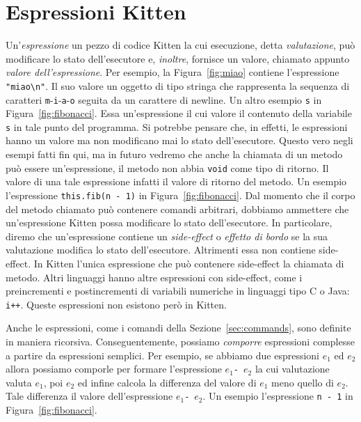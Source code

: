 \section{Espressioni Kitten}\label{sec:expressions}
%
Un'\emph{espressione} \e un pezzo di codice Kitten la cui esecuzione,
detta \emph{valutazione},
pu\`o modificare lo stato dell'esecutore e, \emph{inoltre}, fornisce un
valore, chiamato appunto \emph{valore dell'espressione}. Per esempio, la
Figura~\ref{fig:miao} contiene l'espressione \verb|"miao\n"|. Il suo
valore \e un oggetto di tipo stringa che rappresenta la sequenza di
caratteri \texttt{m}-\texttt{i}-\texttt{a}-\texttt{o} seguita da un
carattere di newline. Un altro esempio \e \texttt{s} in
Figura~\ref{fig:fibonacci}.
Essa \e un'espressione il cui valore \e il contenuto della variabile
\texttt{s} in tale punto del programma.
Si potrebbe pensare che, in effetti, le espressioni
hanno un valore ma non modificano mai lo stato dell'esecutore.
Questo \e vero negli esempi fatti fin qui, ma in futuro vedremo
che anche la chiamata di un metodo pu\`o essere un'espressione, \purche
il metodo non abbia \texttt{void} come tipo di ritorno.
Il valore di una tale espressione \e infatti
il valore di ritorno del metodo. Un esempio \e l'espressione
\texttt{this.fib(n - 1)} in Figura~\ref{fig:fibonacci}. Dal momento che
il corpo del metodo chiamato pu\`o contenere comandi arbitrari,
dobbiamo ammettere che un'espressione Kitten possa modificare lo stato
dell'esecutore. In particolare, diremo che un'espressione contiene
un \emph{side-effect} o \emph{effetto di bordo} se la sua valutazione
modifica lo stato dell'esecutore. Altrimenti essa non contiene side-effect.
In Kitten l'unica espressione che pu\`o contenere side-effect \e la chiamata
di metodo. Altri linguaggi hanno altre espressioni con side-effect, come
i preincrementi e postincrementi di variabili numeriche in
linguaggi tipo C o Java: \texttt{i++}. Queste espressioni non esistono per\`o
in Kitten.

Anche le espressioni, come i comandi della Sezione~\ref{sec:commands},
sono definite in maniera ricorsiva. Conseguentemente, possiamo \emph{comporre}
espressioni complesse a partire da espressioni \piu semplici. Per esempio,
se abbiamo due espressioni $e_1$ ed $e_2$ allora possiamo comporle per
formare l'espressione $e_1$\texttt{-}\ $e_2$ la cui valutazione valuta
$e_1$, poi $e_2$ ed infine calcola la differenza del valore di $e_1$ meno
quello di $e_2$. Tale differenza \e il valore dell'espressione
$e_1$\texttt{-}\ $e_2$.
Un esempio \e l'espressione \texttt{n - 1} in Figura~\ref{fig:fibonacci}.

